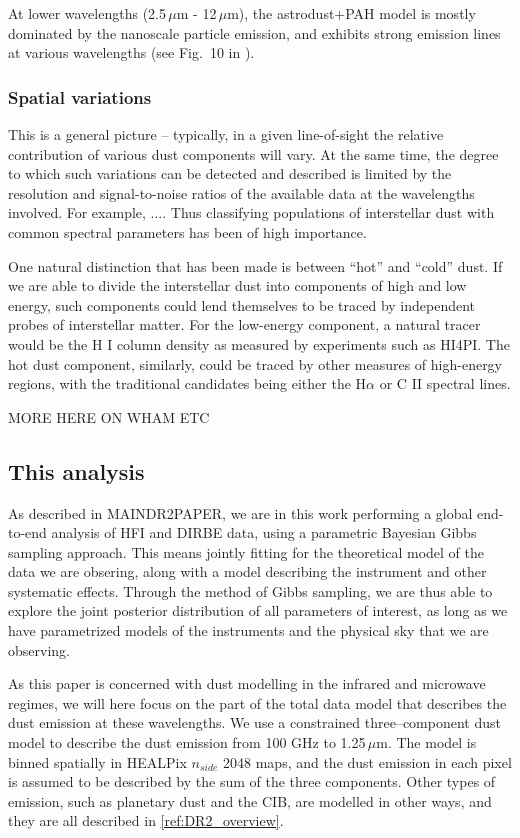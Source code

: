 \documentclass{aa}
\begin{document}
At lower wavelengths (2.5\,$\mu$m - 12\,$\mu$m), the astrodust+PAH model is mostly dominated by the nanoscale particle emission, and exhibits strong emission lines at various wavelengths (see Fig.~10 in \cite{Hensley2023}).

\subsubsection{Spatial variations}
This is a general picture -- typically, in a given line-of-sight the relative contribution of various dust components will vary. At the same time, the degree to which such variations can be detected and described is limited by the resolution and signal-to-noise ratios of the available data at the wavelengths involved. For example, .... Thus classifying populations of interstellar dust with common spectral parameters has been of high importance.

One natural distinction that has been made is between ``hot'' and ``cold'' dust. If we are able to divide the interstellar dust into components of high and low energy, such components could lend themselves to be traced by independent probes of interstellar matter. For the low-energy component, a natural tracer would be the H I column density as measured by experiments such as HI4PI. The hot dust component, similarly, could be traced by other measures of high-energy regions, with the traditional candidates being either the H$\alpha$ or C II spectral lines.

MORE HERE ON WHAM ETC

\subsection{This analysis}
As described in MAINDR2PAPER, we are in this work performing a global end-to-end analysis of HFI and DIRBE data, using a parametric Bayesian Gibbs sampling approach. This means jointly fitting for the theoretical model of the data we are obsering, along with a model describing the instrument and other systematic effects. Through the method of Gibbs sampling, we are thus able to explore the joint posterior distribution of all parameters of interest, as long as we have parametrized models of the instruments and the physical sky that we are observing.


As this paper is concerned with dust modelling in the infrared and microwave regimes, we will here focus on the part of the total data model that describes the dust emission at these wavelengths. We use a constrained three--component dust model to describe the dust emission from 100 GHz to 1.25\,$\mu$m. The model is binned spatially in HEALPix $n_{side}$ 2048 maps, and the dust emission in each pixel is assumed to be described by the sum of the three components. Other types of emission, such as planetary dust and the CIB, are modelled in other ways, and they are all described in \ref{ref:DR2_overview}.
\end{document}
